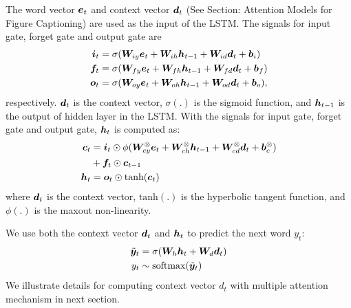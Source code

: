 \documentclass[11pt,a4paper]{article}
\begin{document}


The word vector ${\boldsymbol e}_t$ and context vector ${\boldsymbol d}_t$ (See Section: Attention Models for Figure Captioning) are used as the input of the LSTM.
The signals for input gate, forget gate and output gate are
\begin{align*}
  {\boldsymbol i}_t &= \sigma({\boldsymbol W}_{iy} {\boldsymbol e}_t + {\boldsymbol W}_{ih} {\boldsymbol h}_{t-1} + {\boldsymbol W}_{id} {\boldsymbol d}_{t} + {\boldsymbol b}_i) \\
  {\boldsymbol f}_t &= \sigma({\boldsymbol W}_{fy} {\boldsymbol e}_t + {\boldsymbol W}_{fh} {\boldsymbol h}_{t-1} + {\boldsymbol W}_{fd} {\boldsymbol d}_{t} + {\boldsymbol b}_f) \\
  {\boldsymbol o}_t &= \sigma({\boldsymbol W}_{oy} {\boldsymbol e}_t + {\boldsymbol W}_{oh} {\boldsymbol h}_{t-1} + {\boldsymbol W}_{od} {\boldsymbol d}_{t} + {\boldsymbol b}_o),
\end{align*}
respectively. ${\boldsymbol d}_t$ is the context vector, $\sigma(.)$ is the sigmoid function, and ${\boldsymbol h}_{t-1}$ is the output of hidden layer in the LSTM. With the signals for input gate, forget gate and output gate, ${\boldsymbol h}_{t}$ is computed as:
\begin{align*}
  {\boldsymbol c}_t &= {\boldsymbol i}_t\odot\phi({\boldsymbol W}_{cy}^{\otimes} {\boldsymbol e}_t + {\boldsymbol W}_{ch}^{\otimes} {\boldsymbol h}_{t-1} + {\boldsymbol W}_{cd}^{\otimes} {\boldsymbol d}_t + {\boldsymbol b}_c^{\otimes} ) \\
     & + {\boldsymbol f}_t\odot {\boldsymbol c}_{t-1}\\
  {\boldsymbol h}_t &= {\boldsymbol o}_t\odot \text{tanh}({\boldsymbol c}_t)
\end{align*}
where ${\boldsymbol d}_t$ is the context vector, $\text{tanh}(.)$ is the hyperbolic tangent function, and $\phi(.)$ is the maxout non-linearity.

We use both the context vector ${\boldsymbol d}_t$ and ${\boldsymbol h}_t$ to predict the next word $y_t$:
\begin{align*}
\tilde{{\boldsymbol y}}_t &= \sigma({\boldsymbol W}_h {\boldsymbol h}_t + {\boldsymbol W}_d {\boldsymbol d}_t) \\
y_t & \sim \text{softmax}(\tilde{{\boldsymbol y}}_t)
\end{align*}
We illustrate details for computing context vector $d_t$ with multiple attention mechanism in next section.





\end{document}
